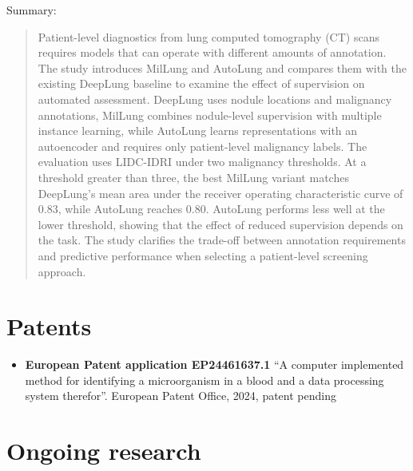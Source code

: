 \begin{itemize}[parsep=0pt,itemsep=0pt]
    Summary:
    \begin{quote}
    Patient-level diagnostics from lung computed tomography (CT) scans requires models that can operate with different amounts of annotation. The study introduces MilLung and AutoLung and compares them with the existing DeepLung baseline to examine the effect of supervision on automated assessment. DeepLung uses nodule locations and malignancy annotations, MilLung combines nodule-level supervision with multiple instance learning, while AutoLung learns representations with an autoencoder and requires only patient-level malignancy labels. The evaluation uses LIDC-IDRI under two malignancy thresholds. At a threshold greater than three, the best MilLung variant matches DeepLung's mean area under the receiver operating characteristic curve of 0.83, while AutoLung reaches 0.80. AutoLung performs less well at the lower threshold, showing that the effect of reduced supervision depends on the task. The study clarifies the trade-off between annotation requirements and predictive performance when selecting a patient-level screening approach.
    \end{quote}
\end{itemize}

\section{Patents}

\begin{itemize}
    \item \textbf{European Patent application EP24461637.1} ``A computer implemented method for identifying a microorganism in a blood and a data processing system therefor''. European Patent Office, 2024, patent pending
\end{itemize}

\section{Ongoing research}

